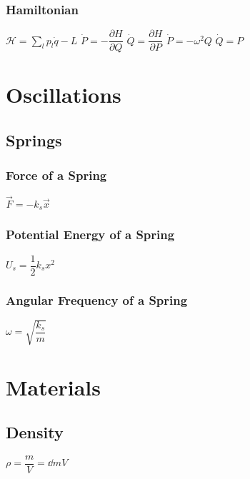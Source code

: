\subsubsection{Hamiltonian}
\begin{itemize}
\itemt \( \mathcal{H} = \sum\limits_{l} p_l \dot{q} - L \)
\itemt \( \dot{P} = -\dfrac{\partial H}{\partial Q} \)		
\itemt \( \dot{Q} = \dfrac{\partial H}{\partial P} \)
\itemt \( \dot{P} = -\omega^2Q \)
\itemt \(\dot{Q} = P\)
\end{itemize}
				
	\section{Oscillations}

\subsection{Springs}

\subsubsection{Force of a Spring}
\begin{itemize}
\itemt \(\vec{F} = -k_s\vec{x}\)
\end{itemize}

\subsubsection{Potential Energy of a Spring}
\begin{itemize}
\itemt \( U_s = \dfrac{1}{2} k_s x^2 \)
\end{itemize}

\subsubsection{Angular Frequency of a Spring}
\begin{itemize}
\itemt \( \omega = \sqrt{\dfrac{k_s}{m}} \)
\end{itemize}

	\section{Materials}

\subsection{Density}
\begin{itemize}
\itemt \( \rho = \dfrac{m}{V} = \dd{m}{V} \)
\end{itemize}
				
